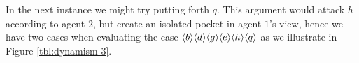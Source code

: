 \documentclass{llncs}
\begin{document}
In the next instance we might try putting forth $q$. This argument would attack $h$ according to agent $2$, but create an isolated pocket in agent $1$'s view, hence we have two cases when evaluating the case $\langle{b}\rangle \langle{d}\rangle \langle{g}\rangle \langle{e}\rangle \langle{h}\rangle \langle{q}\rangle$ as we illustrate in Figure \ref{tbl:dynamism-3}.
  
\end{document}
